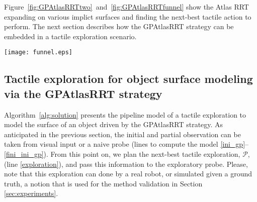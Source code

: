 Figure~\ref{fig:GPAtlasRRTtwo}~and~\ref{fig:GPAtlasRRTfunnel} show the Atlas RRT expanding on various implict surfaces and finding the next-best tactile action to perform.
The next section describes how the GPAtlasRRT strategy can be embedded in a tactile exploration scenario.

\begin{figure*}[hbt]
    \centering
    \texttt{[image: funnel.eps]}
    \caption{ A funnel (left-upper corner) is first seen by a depth camera. The segmented 3D points are shown in blue in the left figure to form the training set $\mathcal{S}^0$. The predicted shape by the GP on this set is shown in the middle obtained via a marching cube sampling algorithm. However, the GPAtlasRRT strategy does not require the explicit form of the predicted surface, as shown in the right figure. It works with the implicit form to devise the next-best tactile exploration shown in brighter green.}
    \label{fig:GPAtlasRRTfunnel}
\end{figure*}

\subsection{Tactile exploration for object surface modeling via the GPAtlasRRT strategy}
\label{sec:gpatlasrrt_tactile_exploration}

Algorithm~\ref{alg:solution} presents the pipeline model of a tactile exploration to model the surface of an object driven by the GPAtlasRRT strategy. As anticipated in the previous section, the initial and partial observation can be taken from visual input or a naive probe (lines to compute the model \ref{ini_gp}--\ref{fini_ini_gp}). From this point on, we plan the next-best tactile exploration, $\mathcal{P}$, (line \ref{exploration}), and pass this information to the exploratory probe. Please, note that this exploration can done by a real robot, or simulated given a ground truth, a notion that is used for the method validation in Section \ref{sec:experiments}.

